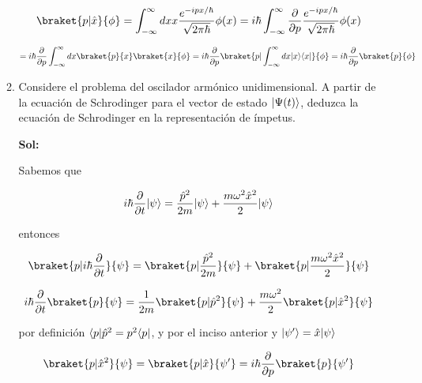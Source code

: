 \documentclass[12pt,a4paper]{article}
\DeclarePairedDelimiter\bra{\langle}{\rvert}
\DeclarePairedDelimiter\ket{\lvert}{\rangle}
\begin{document}
\begin{enumerate}
\begin{enumerate}
    \begin{equation*}
        \braket{p|\hat{x}}{\phi} = \int_{-\infty}^{\infty} dx x \frac{e^{-ipx/\hbar}}{\sqrt{2\pi \hbar}} \phi (x) = i \hbar \int_{-\infty}^{\infty} \frac{\partial}{\partial p} \frac{e^{-ipx/\hbar}}{\sqrt{2\pi \hbar}} \phi (x)
    \end{equation*}
    
    \begin{equation*}
        = i \hbar  \frac{\partial}{\partial p} \int_{-\infty}^{\infty} dx \braket{p}{x} \braket{x}{\phi} = i \hbar \frac{\partial}{\partial p} \braket{p|\int_{-\infty}^{\infty}dx\ket{x}\bra{x}}{\phi} = i \hbar \frac{\partial}{\partial p} \braket{p}{\phi}
    \end{equation*}
    
    
    
    \item Considere el problema del oscilador armónico unidimensional. A partir de la ecuación de Schrodinger para el vector de estado $\ket{\Psi (t)}$, deduzca la ecuación de Schrodinger en la representación de ímpetus.
    
    \textbf{Sol:}
    
    Sabemos que
    
    \begin{equation*}
        i \hbar \frac{\partial}{\partial t} \ket{\psi} = \frac{\hat{p}^2}{2m} \ket{\psi} + \frac{m \omega^2 \hat{x}^2}{2} \ket{\psi}
    \end{equation*}
    
    entonces
    
    \begin{equation*}
        \braket{p|i\hbar \frac{\partial}{\partial t}}{\psi} = \braket{p| \frac{\hat{p}^2}{2m}}{\psi} + \braket{p | \frac{m\omega^2 \hat{x}^2}{2}}{\psi}
    \end{equation*}
    
    \begin{equation*}
        i \hbar \frac{\partial}{\partial t} \braket{p}{\psi} =\frac{1}{2m} \braket{p |\hat{p}^2}{\psi} +  \frac{m \omega^2}{2} \braket{p | \hat{x}^2}{\psi}
    \end{equation*}
    
    por definición $\bra{p}\hat{p}^2 = p^2 \bra{p}$, y por el inciso anterior y  $\ket{\psi ' } = \hat{x} \ket{\psi}$
    
    \begin{equation*}
        \braket{p | \hat{x}^2}{\psi} = \braket{p | \hat{x}}{\psi'} = i \hbar \frac{\partial}{\partial p} \braket{p}{\psi'}
    \end{equation*}
    

\end{enumerate}
\end{enumerate}
\end{document}
